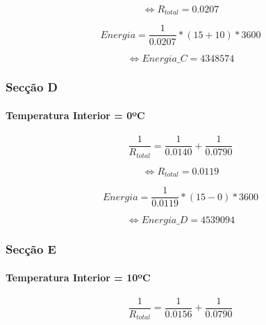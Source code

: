 \documentclass[12pt, a4paper]{article}
\begin{document}
\begin{equation}
	\Leftrightarrow R_{total} =
	{0.0207}
	\label{eq:totalC2}
\end{equation}

\begin{equation}
	Energia =
	\dfrac{1}{0.0207} *
	\left( {15+10} \right) *
	3600
	\label{eq:energiaC}
\end{equation}

\begin{equation}
	\Leftrightarrow Energia\_C =
	4348574
	\label{eq:energiaC1}
\end{equation}

\subsubsection{Secção D}\label{seccaoD}
\paragraph{Temperatura Interior = 0ºC}

\begin{equation}
	\dfrac{1}{R_{total}} =
	\dfrac{1}{0.0140} +
	\dfrac{1}{0.0790}
	\label{eq:totalD1}
\end{equation}

\begin{equation}
	\Leftrightarrow R_{total} =
	{0.0119}
	\label{eq:totalD2}
\end{equation}

\begin{equation}
	Energia =
	\dfrac{1}{0.0119} *
	\left( {15-0} \right) *
	3600
	\label{eq:energiaD}
\end{equation}

\begin{equation}
	\Leftrightarrow Energia\_D =
	4539094
	\label{eq:energiaD1}
\end{equation}

\subsubsection{Secção E}\label{seccaoE}
\paragraph{Temperatura Interior = 10ºC}

\begin{equation}
	\dfrac{1}{R_{total}} =
	\dfrac{1}{0.0156} +
	\dfrac{1}{0.0790}
	\label{eq:totalE1}
\end{equation}
\end{document}
